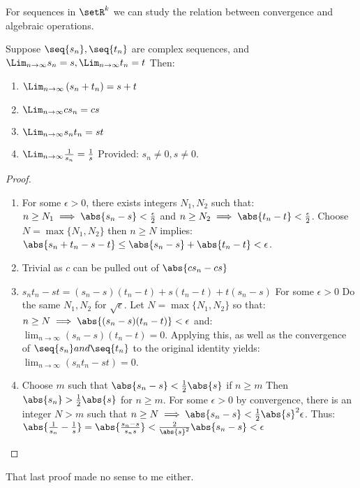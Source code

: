 \documentclass[12pt, letterpaper]{paper}
\begin{document}
For sequences in $\setR^{k}$ we can study the relation between
convergence and algebraic operations.

\begin{theorem}
  \label{thr:3.3}
  Suppose $\seq{s_n}, \seq{t_n}$ are complex sequences, and
  $\Lim_{n\to\infty}s_n = s, \Lim_{n\to\infty} t_n = t$ Then:
  \begin{enumerate}
  \item $\Lim_{n\to\infty} \left( s_n + t_n \right) = s + t$
  \item $\Lim_{n\to \infty} c s_n = cs$
  \item $\Lim_{n\to \infty} s_n t_n = st$
  \item $\Lim_{n \to \infty}\frac{1}{s_n} = \frac{1}{s}$ Provided:
    $s_n \neq 0, s \neq 0$.
  \end{enumerate}
\end{theorem}
\begin{proof}
  \begin{enumerate}
  \item For some $\epsilon > 0$, there exists integers $N_1, N_2$ such
    that: $n \geq N_1 \implies \abs{ s_n - s} < \frac{\epsilon}{2}$
    and $n \geq N_2 \implies \abs{ t_n - t} < \frac{\epsilon}{2}$.
    Choose $N = \max\{ N_1, N_2 \}$ then $n \geq N$ implies:
    $\abs{ s_n + t_n - s - t} \leq \abs{ s_n - s} + \abs{ t_n - t} <
    \epsilon$.
  
  \item Trivial as $c$ can be pulled out of $\abs{c s_n - cs}$
  \item $s_nt_n - st = (s_n -s )(t_n - t) + s( t_n - t) + t(s_n - s)$
    For some $\epsilon>0$ Do the same $N_1, N_2$ for
    $\sqrt{\epsilon}$. Let $N = \max\{ N_1, N_2 \}$ so that:
    $n \geq N \implies \abs{ (s_n-s)(t_n-t)} < \epsilon$ and:
    $\lim_{n\to \infty}(s_n-s)(t_n-t) = 0$. Applying this, as well as
    the convergence of $\seq{s_n} and \seq{t_n}$ to the original
    identity yields: $\lim_{n \to \infty} (s_n t_n - st ) = 0$.
  \item Choose $m$ such that $\abs{s_n-s} < \frac{1}{2} \abs{s}$ if
    $n \geq m$ Then $\abs{s_n} > \frac{1}{2}\abs{s}$ for $n \geq
    m$. For some $\epsilon > 0$ by convergence, there is an integer
    $N > m$ such that
    $n \geq N \implies \abs{s_n - s} < \frac{1}{2}\abs{s}^2
    \epsilon$. Thus:
    $\abs{ \frac{1}{s_n} - \frac{1}{s}} = \abs{\frac{s_n-s}{s_n s}} <
    \frac{2}{\abs{s}^2} \abs{ s_n - s} < \epsilon$
  \end{enumerate}
\end{proof}
That last proof made no sense to me either.
\end{document}
